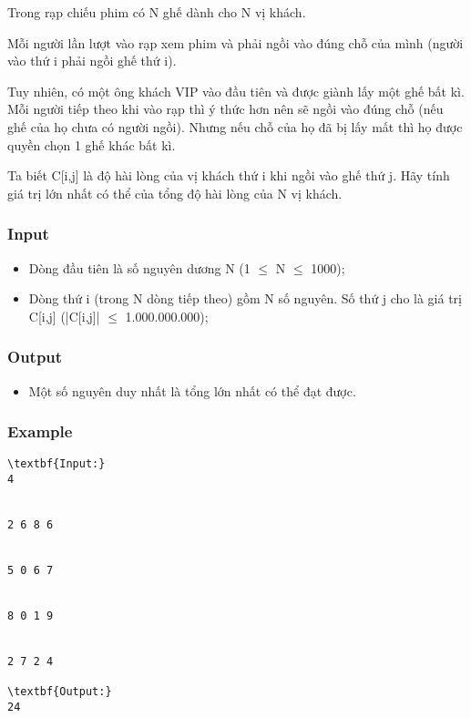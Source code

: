 



   Trong rạp chiếu phim có N ghế dành cho N vị khách.  

   Mỗi người lần lượt vào rạp xem phim và phải ngồi vào đúng chỗ của mình (người vào thứ i phải ngồi ghế thứ i).  

   Tuy nhiên, có một ông khách VIP vào đầu tiên và được giành lấy một ghế bất kì. Mỗi người tiếp theo khi vào rạp thì ý thức hơn nên sẽ ngồi vào đúng chỗ (nếu ghế của họ chưa có người ngồi). Nhưng nếu chỗ của họ đã bị lấy mất thì họ được quyền chọn 1 ghế khác bất kì.  

   Ta biết C[i,j] là độ hài lòng của vị khách thứ i khi ngồi vào ghế thứ j. Hãy tính giá trị lớn nhất có thể của tổng độ hài lòng của N vị khách.  

\subsubsection{   Input  }
\begin{itemize}
	\item     Dòng đầu tiên là số nguyên dương N (1  $\le$  N  $\le$  1000);   
	\item     Dòng thứ i (trong N dòng tiếp theo) gồm N số nguyên. Số thứ j cho là giá trị C[i,j] (|C[i,j]|  $\le$  1.000.000.000);   
\end{itemize}

\subsubsection{   Output  }
\begin{itemize}
	\item     Một số nguyên duy nhất là tổng lớn nhất có thể đạt được.   
\end{itemize}

\subsubsection{   Example  }
\begin{verbatim}
\textbf{Input:}
4


2 6 8 6 


5 0 6 7 


8 0 1 9 


2 7 2 4

\textbf{Output:}
24


\end{verbatim}
